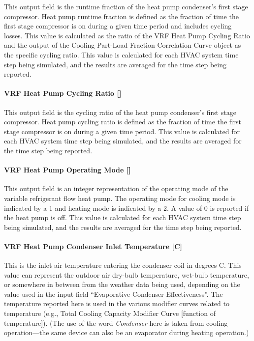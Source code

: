 This output field is the runtime fraction of the heat pump condenser's first stage compressor. Heat pump runtime fraction is defined as the fraction of time the first stage compressor is on during a given time period and includes cycling losses. This value is calculated as the ratio of the VRF Heat Pump Cycling Ratio and the output of the Cooling Part-Load Fraction Correlation Curve object as the specific cycling ratio. This value is calculated for each HVAC system time step being simulated, and the results are averaged for the time step being reported.

\paragraph{\texorpdfstring{VRF Heat Pump Cycling Ratio {[]}}{VRF Heat Pump Cycling Ratio }}\label{vrf-heat-pump-cycling-ratio}

This output field is the cycling ratio of the heat pump condenser's first stage compressor. Heat pump cycling ratio is defined as the fraction of time the first stage compressor is on during a given time period. This value is calculated for each HVAC system time step being simulated, and the results are averaged for the time step being reported.

\paragraph{\texorpdfstring{VRF Heat Pump Operating Mode {[]}}{VRF Heat Pump Operating Mode }}\label{vrf-heat-pump-operating-mode}

This output field is an integer representation of the operating mode of the variable refrigerant flow heat pump. The operating mode for cooling mode is indicated by a 1 and heating mode is indicated by a 2. A value of 0 is reported if the heat pump is off. This value is calculated for each HVAC system time step being simulated, and the results are averaged for the time step being reported.

\paragraph{VRF Heat Pump Condenser Inlet Temperature {[}C{]}}\label{vrf-heat-pump-condenser-inlet-temperature-c}

This is the inlet air temperature entering the condenser coil in degrees C. This value can represent the outdoor air dry-bulb temperature, wet-bulb temperature, or somewhere in between from the weather data being used, depending on the value used in the input field ``Evaporative Condenser Effectiveness''. The temperature reported here is used in the various modifier curves related to temperature (e.g., Total Cooling Capacity Modifier Curve {[}function of temperature{]}). (The use of the word \emph{Condenser} here is taken from cooling operation---the same device can also be an evaporator during heating operation.)

